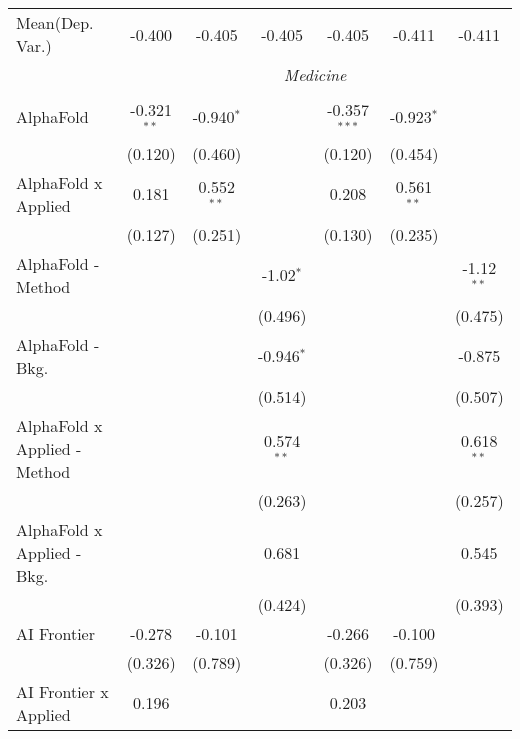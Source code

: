 \begin{tabular}{lcccccc}
Mean(Dep. Var.) & -0.400 & -0.405 & -0.405 & -0.405 & -0.411 & -0.411 \\
 & \multicolumn{6}{c}{\textit{Medicine}} \\ \\
   AlphaFold                      & -0.321$^{**}$ & -0.940$^{*}$ &               & -0.357$^{***}$ & -0.923$^{*}$  &   \\   
                                  & (0.120)       & (0.460)      &               & (0.120)        & (0.454)       &   \\   
   AlphaFold x Applied            & 0.181         & 0.552$^{**}$ &               & 0.208          & 0.561$^{**}$  &   \\   
                                  & (0.127)       & (0.251)      &               & (0.130)        & (0.235)       &   \\   
   AlphaFold - Method             &               &              & -1.02$^{*}$   &                &               & -1.12$^{**}$\\   
                                  &               &              & (0.496)       &                &               & (0.475)\\   
   AlphaFold - Bkg.               &               &              & -0.946$^{*}$  &                &               & -0.875\\   
                                  &               &              & (0.514)       &                &               & (0.507)\\   
   AlphaFold x Applied - Method   &               &              & 0.574$^{**}$  &                &               & 0.618$^{**}$\\   
                                  &               &              & (0.263)       &                &               & (0.257)\\   
   AlphaFold x Applied - Bkg.     &               &              & 0.681         &                &               & 0.545\\   
                                  &               &              & (0.424)       &                &               & (0.393)\\   
   AI Frontier                    & -0.278        & -0.101       &               & -0.266         & -0.100        &   \\   
                                  & (0.326)       & (0.789)      &               & (0.326)        & (0.759)       &   \\   
   AI Frontier x Applied          & 0.196         &              &               & 0.203          &               &   \\   

\end{tabular}
